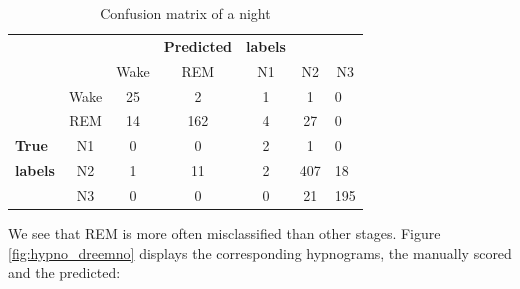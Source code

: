 \documentclass[12pt]{report}
\begin{document}
\begin{table}[H]
\centering
\begin{tabular}{lcccccl}
                              & \multicolumn{1}{l}{}      &                           & \multicolumn{1}{r}{\textbf{Predicted}} & \multicolumn{1}{l}{\textbf{labels}} &                          &                        \\
                              & \multicolumn{1}{c|}{}     & \multicolumn{1}{c|}{Wake} & \multicolumn{1}{c|}{REM}               & \multicolumn{1}{c|}{N1}             & \multicolumn{1}{c|}{N2}  & \multicolumn{1}{c}{N3} \\ \cline{2-7} 
\multicolumn{1}{c}{\textbf{}} & \multicolumn{1}{c|}{Wake} & \multicolumn{1}{c|}{25}   & \multicolumn{1}{c|}{2}                 & \multicolumn{1}{c|}{1}              & \multicolumn{1}{c|}{1}   & 0                      \\ \cline{2-7} 
\multicolumn{1}{c}{}          & \multicolumn{1}{c|}{REM}  & \multicolumn{1}{c|}{14}   & \multicolumn{1}{c|}{162}               & \multicolumn{1}{c|}{4}              & \multicolumn{1}{c|}{27}  & 0                      \\ \cline{2-7} 
\textbf{True}                 & \multicolumn{1}{c|}{N1}   & \multicolumn{1}{c|}{0}    & \multicolumn{1}{c|}{0}                 & \multicolumn{1}{c|}{2}              & \multicolumn{1}{c|}{1}   & 0                      \\ \cline{2-7} 
\textbf{labels}               & \multicolumn{1}{c|}{N2}   & \multicolumn{1}{c|}{1}    & \multicolumn{1}{c|}{11}                & \multicolumn{1}{c|}{2}              & \multicolumn{1}{c|}{407} & 18                     \\ \cline{2-7} 
                              & \multicolumn{1}{c|}{N3}   & \multicolumn{1}{c|}{0}    & \multicolumn{1}{c|}{0}                 & \multicolumn{1}{c|}{0}              & \multicolumn{1}{c|}{21}  & 195                   
\end{tabular}
\caption{\label{tab:confusion_mat}Confusion matrix of a night}
\end{table}

We see that REM is more often misclassified than other stages. Figure \ref{fig:hypno_dreemno} displays the corresponding hypnograms, the manually scored and the predicted:
\end{document}
